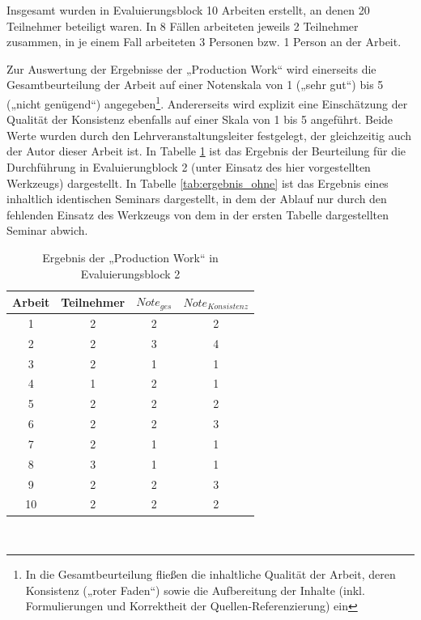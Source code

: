 Insgesamt wurden in Evaluierungsblock 10 Arbeiten erstellt, an denen 20 Teilnehmer beteiligt waren. In 8 Fällen arbeiteten jeweils 2 Teilnehmer zusammen, in je einem Fall arbeiteten 3 Personen bzw. 1 Person an der Arbeit.

Zur Auswertung der Ergebnisse der „Production Work“ wird einerseits die Gesamtbeurteilung der Arbeit auf einer Notenskala von 1 („sehr gut“) bis 5 („nicht genügend“) angegeben\footnote{In die Gesamtbeurteilung fließen die inhaltliche Qualität der Arbeit, deren Konsistenz („roter Faden“) sowie die Aufbereitung der Inhalte (inkl. Formulierungen und Korrektheit der Quellen-Referenzierung) ein}. Andererseits wird explizit eine Einschätzung der Qualität der Konsistenz ebenfalls auf einer Skala von 1 bis 5 angeführt. Beide Werte wurden durch den Lehrveranstaltungsleiter festgelegt, der gleichzeitig auch der Autor dieser Arbeit ist. In Tabelle \ref{tab:ergebnis} ist das Ergebnis der Beurteilung für die Durchführung in Evaluierungblock 2 (unter Einsatz des hier vorgestellten Werkzeugs) dargestellt. In Tabelle \ref{tab:ergebnis_ohne} ist das Ergebnis eines inhaltlich identischen Seminars dargestellt, in dem der Ablauf nur durch den fehlenden Einsatz des Werkzeugs von dem in der ersten Tabelle dargestellten Seminar abwich. 

\begin{table}[htbp]
	\centering
	\caption{Ergebnis der „Production Work“ in Evaluierungsblock 2}

\begin{tabular}{| c || c || c | c |}
  \hline
   Arbeit & Teilnehmer & $Note_{ges}$ & $Note_{Konsistenz}$ \\ \hline
   1         & 2 & 2 & 2 \\ 
   2         & 2 & 3 & 4 \\ 
   3         & 2 & 1 & 1 \\ 
   4         & 1 & 2 & 1 \\ 
   5         & 2 & 2 & 2 \\ 
   6         & 2 & 2 & 3 \\ 
   7         & 2 & 1 & 1 \\ 
   8         & 3 & 1 & 1 \\ 
   9         & 2 & 2 & 3 \\ 
   10        & 2 & 2 & 2 \\ \hline
\end{tabular} \\ 
	\label{tab:ergebnis}
\end{table}

